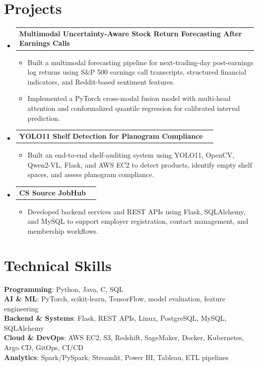 \documentclass[letterpaper,11pt]{article}
\makeatletter
\newcommand{\resumeItem}[1]{
  \item\small{
    {#1 \vspace{-2pt}}
  }
}
\newcommand{\resumeProjectHeading}[2]{
    \item
    \begin{tabular*}{0.97\textwidth}{l@{\extracolsep{\fill}}r}
      \small#1 & #2 \\
    \end{tabular*}\vspace{-7pt}
}
\newcommand{\resumeSubHeadingListStart}{\begin{itemize}[leftmargin=0.15in, label={}]}
\newcommand{\resumeSubHeadingListEnd}{\end{itemize}}
\newcommand{\resumeItemListStart}{\begin{itemize}}
\newcommand{\resumeItemListEnd}{\end{itemize}\vspace{-5pt}}
\makeatother
\begin{document}
\section{Projects}
    \resumeSubHeadingListStart
      \resumeProjectHeading
          {\textbf{Multimodal Uncertainty-Aware Stock Return Forecasting After Earnings Calls}}{}
          \resumeItemListStart
            \resumeItem{Built a multimodal forecasting pipeline for next-trading-day post-earnings log returns using S\&P 500 earnings call transcripts, structured financial indicators, and Reddit-based sentiment features.}
            \resumeItem{Implemented a PyTorch cross-modal fusion model with multi-head attention and conformalized quantile regression for calibrated interval prediction.}
          \resumeItemListEnd
      \resumeProjectHeading
          {\textbf{YOLO11 Shelf Detection for Planogram Compliance}}{}
          \resumeItemListStart
            \resumeItem{Built an end-to-end shelf-auditing system using YOLO11, OpenCV, Qwen2-VL, Flask, and AWS EC2 to detect products, identify empty shelf spaces, and assess planogram compliance.}
          \resumeItemListEnd
      \resumeProjectHeading
          {\textbf{CS Source JobHub}}{}
          \resumeItemListStart
            \resumeItem{Developed backend services and REST APIs using Flask, SQLAlchemy, and MySQL to support employer registration, contact management, and membership workflows.}
          \resumeItemListEnd
    \resumeSubHeadingListEnd

\section{Technical Skills}
 \begin{itemize}[leftmargin=0.15in, label={}]
    \small{\item{
     \textbf{Programming}{: Python, Java, C, SQL} \\
     \textbf{AI \& ML}{: PyTorch, scikit-learn, TensorFlow, model evaluation, feature engineering} \\
     \textbf{Backend \& Systems}{: Flask, REST APIs, Linux, PostgreSQL, MySQL, SQLAlchemy} \\
     \textbf{Cloud \& DevOps}{: AWS EC2, S3, Redshift, SageMaker, Docker, Kubernetes, Argo CD, GitOps, CI/CD} \\
     \textbf{Analytics}{: Spark/PySpark, Streamlit, Power BI, Tableau, ETL pipelines} \\
    }}
 \end{itemize}
\end{document}

